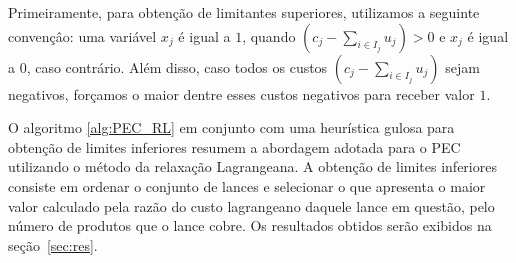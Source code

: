 \documentclass{article}
\begin{document}
	Primeiramente, para obtenção de limitantes superiores, utilizamos a seguinte convençâo: uma variável $x_j$ é igual a $1$, quando $(c_{j} - \displaystyle\sum\limits_{i \in I_j} u_{j}) > 0$ e $x_j$ é igual a $0$, caso contrário. Além disso, caso todos os custos $(c_{j} - \displaystyle\sum\limits_{i \in I_j} u_{j})$ sejam negativos, forçamos o maior dentre esses custos negativos para receber valor $1$.
	
	O algoritmo \ref{alg:PEC_RL} em conjunto com uma heurística gulosa para obtenção de limites inferiores resumem a abordagem adotada para o PEC utilizando o método da relaxação Lagrangeana. A obtenção de limites inferiores consiste em ordenar o conjunto de lances e selecionar o que apresenta o maior valor calculado pela razão do custo lagrangeano daquele lance em questão, pelo número de produtos que o lance cobre. Os resultados obtidos serão exibidos na seção~\ref{sec:res}.
	
\end{document}
